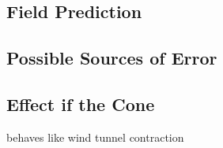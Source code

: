 \label{sec:field}

\subsection{Field Prediction}

\subsection{Possible Sources of Error}

\subsection{Effect if the Cone}

behaves like wind tunnel contraction